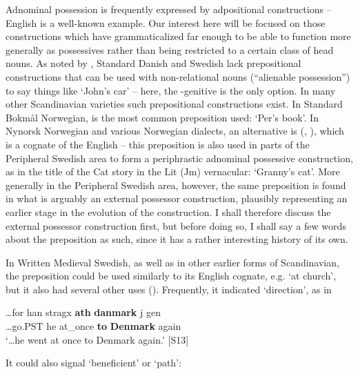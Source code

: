 Adnominal possession is frequently expressed by adpositional constructions – English is a well-known example. Our interest here will be focused on those constructions which have grammaticalized far enough to be able to function more generally as possessives rather than being restricted to a certain class of head nouns. As noted by \citet[43]{Delsing2003a}, Standard Danish and Swedish lack prepositional constructions that can be used with non-relational nouns (“alienable possession”) to say things like ‘John’s car’ – here, the -genitive is the only option. In many other Scandinavian varieties such prepositional constructions exist. In Standard Bokmål Norwegian,  is the most common preposition used:  ‘Per’s book’. In Nynorsk Norwegian and various Norwegian dialects, an alternative is (\citet[263]{FaarlundEtAl1997}, \citet[43]{Delsing2003a}), which is a cognate of the English  – this preposition is also used in parts of the Peripheral Swedish area to form a periphrastic adnominal possessive construction, as in the title of the Cat story in the Lit (Jm) vernacular: ‘Granny’s cat’. More generally in the Peripheral Swedish area, however, the same preposition is found in what is arguably an external possessor construction, plausibly representing an earlier stage in the evolution of the construction. I shall therefore discuss the external possessor construction first, but before doing so, I shall say a few words about the preposition as such, since it has a rather interesting history of its own. 

In Written Medieval Swedish, as well as in other earlier forms of Scandinavian, the preposition  could be used similarly to its English cognate, e.g.  ‘at church’, but it also had several other uses (\citet{Söderwall1884}). Frequently, it indicated ‘direction’, as in

\ea\label{}
\gll …for  han  stragx  \textbf{ath} \textbf{danmark} j gen\\
…go.PST  he  at\_once  \textbf{to} \textbf{Denmark} again\\
\glt ‘…he went at once to Denmark again.’ [S13]
\z

It could also signal ‘beneficient’ or ‘path’:

